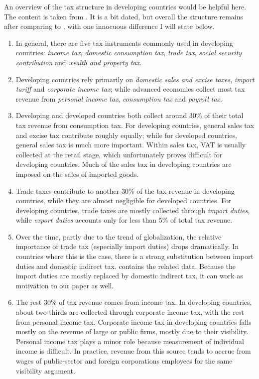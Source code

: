 \documentclass[twoside,11pt,leqno]{article}
\begin{document}
An overview of the tax structure in developing countries would be helpful here. The content is taken from \citet{BurgessStern:1993}. It is a bit dated, but overall the structure remains after comparing to \citet{IMF:2011}, with one innocuous difference I will state below.
\begin{enumerate}
    \item
    In general, there are five tax instruments commonly used in developing countries: \textit{income tax}, \textit{domestic consumption tax}, \textit{trade tax}, \textit{social security contribution} and \textit{wealth and property tax}.
    \item
    Developing countries rely primarily on \textit{domestic sales and excise taxes}, \textit{import tariff} and \textit{corporate income tax}; while advanced economies collect most tax revenue from \textit{personal income tax}, \textit{consumption tax} and \textit{payroll tax}.
    \item
    Developing and developed countries both collect around 30\% of their total tax revenue from consumption tax. For developing countries, general sales tax and excise tax contribute roughly equally; while for developed countries, general sales tax is much more important. Within sales tax, VAT is usually collected at the retail stage, which unfortunately proves difficult for developing countries. Much of the sales tax in developing countries are imposed on the sales of imported goods.
    \item
    Trade taxes contribute to another 30\% of the tax revenue in developing countries, while they are almost negligible for developed countries. For developing countries, trade taxes are mostly collected through \textit{import duties}, while \textit{export duties} accounts only for less than 5\% of total tax revenue.
    \item
    Over the time, partly due to the trend of globalization, the relative importance of trade tax (especially import duties) drops dramatically. In countries where this is the case, there is a strong substitution between import duties and domestic indirect tax. \citet{IMF:2011} contains the related data. Because the import duties are mostly replaced by domestic indirect tax, it can work as motivation to our paper as well.
    \item
    The rest 30\% of tax revenue comes from income tax. In developing countries, about two-thirds are collected through corporate income tax, with the rest from personal income tax. Corporate income tax in developing countries falls mostly on the revenue of large or public firms, mostly due to their visibility. Personal income tax plays a minor role because measurement of individual income is difficult. In practice, revenue from this source tends to accrue from wages of public-sector and foreign corporations employees for the same visibility argument.

\end{enumerate}
\end{document}
